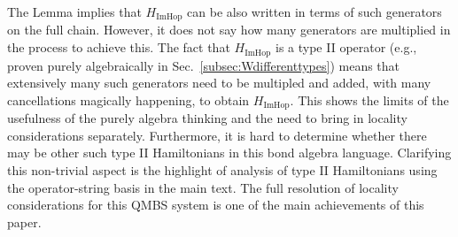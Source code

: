 \documentclass[prx,letterpaper,aps,superscriptaddress,floatfix,twocolumn,nofootinbib]{revtex4-2}
\theoremstyle{definition}
\begin{document}
%
The Lemma implies that $H_{\text{ImHop}}$ can be also written in terms of such generators on the full chain.
%
However, it does not say how many generators are multiplied in the process to achieve this.
The fact that $H_{\text{ImHop}}$ is a type II operator (e.g., proven purely algebraically in Sec.~\ref{subsec:Wdifferenttypes}) means that extensively many such generators need to be multipled and added, with many cancellations magically happening, to obtain $H_{\text{ImHop}}$.
%
This shows the limits of the usefulness of the purely algebra thinking and the need to bring in locality considerations separately.
%
Furthermore, it is hard to determine whether there may be other such type II Hamiltonians in this bond algebra language.
%
Clarifying this non-trivial aspect is the highlight of analysis of type II Hamiltonians using the operator-string basis in the main text.
%
The full resolution of locality considerations for this QMBS system is one of the main achievements of this paper.
%
\end{document}
